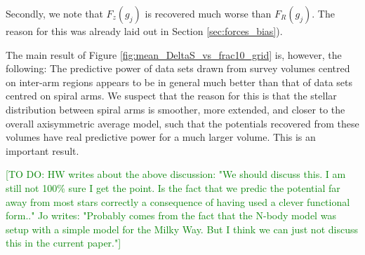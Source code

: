 \documentclass[iop,revtex4,numberedappendix,appendixfloats]{emulateapj}
\newcommand{\HW}[1]{\textcolor{Green}{#1}}
\begin{document}
Secondly, we note that $F_z(g_j)$ is recovered much worse than $F_R(g_j)$. The reason for this was already laid out in Section \ref{sec:forces_bias}). 

The main result of Figure \ref{fig:mean_DeltaS_vs_frac10_grid} is, however, the following: The predictive power of data sets drawn from survey volumes centred on inter-arm regions appears to be in general much better than that of data sets centred on spiral arms. We suspect that the reason for this is that the stellar distribution between spiral arms is smoother, more extended, and closer to the overall axisymmetric average model, such that the potentials recovered from these volumes have real predictive power for a much larger volume. This is an important result.

\HW{[TO DO: HW writes about the above discussion: "We should discuss this. I am still not 100\% sure I get the point. Is the fact that we predic the potential far away from most stars correctly a consequence of having used a clever functional form.." Jo writes: "Probably comes from the fact that the N-body model was setup with a simple model for the Milky Way. But I think we can just not discuss this in the current paper."]}
\end{document}
